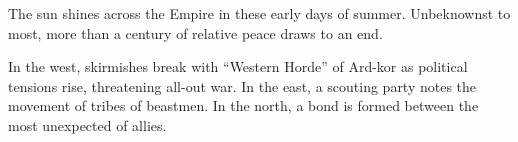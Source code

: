 The sun shines across the Empire in these early days of summer.
Unbeknownst to most, more than a century of relative peace draws to an end.

In the west, skirmishes break with ``Western Horde'' of Ard-kor as political tensions rise,
  threatening all-out war.
In the east, a scouting party notes the movement of tribes of beastmen.
In the north, a bond is formed between the most unexpected of allies.





